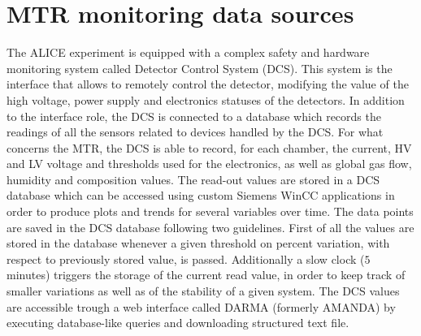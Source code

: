 \section{MTR monitoring data sources}
The ALICE experiment is equipped with a complex safety and hardware monitoring system called Detector Control System (DCS).
This system is the interface that allows to remotely control the detector, modifying the value of the high voltage, power supply and electronics statuses of the detectors.
In addition to the interface role, the DCS is connected to a database which records the readings of all the sensors related to devices handled by the DCS.
For what concerns the MTR, the DCS is able to record, for each chamber, the current, HV and LV voltage and thresholds used for the electronics, as well as global gas flow, humidity and composition values.
The read-out values are stored in a DCS database which can be accessed using custom Siemens WinCC applications in order to produce plots and trends for several variables over time.
The data points are saved in the DCS database following two guidelines.
First of all the values are stored in the database whenever a given threshold on percent variation, with respect to previously stored value, is passed.
Additionally a slow clock ($5$ minutes) triggers the storage of the current read value, in order to keep track of smaller variations as well as of the stability of a given system.
The DCS values are accessible trough a web interface called DARMA (formerly AMANDA) by executing database-like queries and downloading structured text file.


